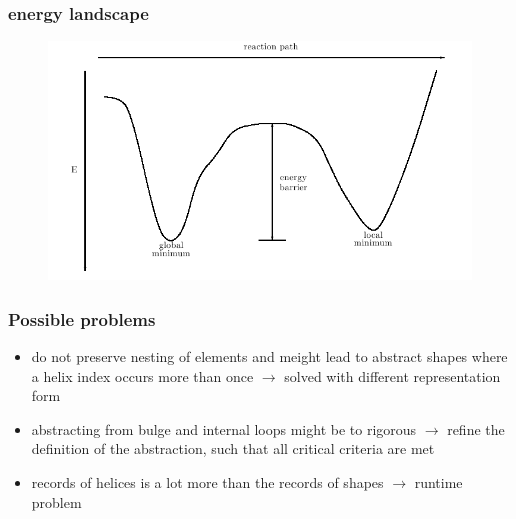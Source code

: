 \documentclass[ignorenonframetext,10pt]{beamer}
\begin{document}
\begin{frame}
\frametitle{energy landscape}  
\begin{figure}
  \includegraphics[scale=0.4]{images/energy_landscape.jpg} 
\end{figure}
\end{frame}


\begin{frame}
\frametitle{Possible problems}
    \begin{itemize} 
    \item do not preserve nesting of elements and meight lead to abstract shapes
    where a helix index occurs more than once $\rightarrow$ solved with
    different representation form
    \item abstracting from bulge and internal loops might be to rigorous
    $\rightarrow$ refine the definition of the abstraction, such that all critical criteria
    are met
    \item records of helices is a lot more than the records of shapes
    $\rightarrow$ runtime problem  %
    \end{itemize}
\end{frame}
\end{document}
